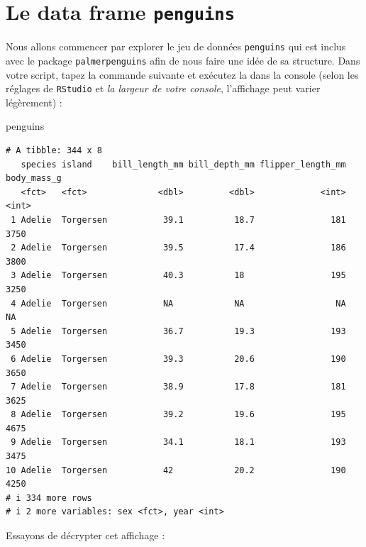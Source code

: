 \documentclass[
  a4paper,
  DIV=11,
  numbers=noendperiod,
  oneside]{scrreprt}
\newenvironment{Shaded}{}{}
\newcommand{\NormalTok}[1]{\textcolor[rgb]{0.14,0.16,0.18}{#1}}
\begin{document}
\section{\texorpdfstring{Le data frame
\texttt{penguins}}{Le data frame penguins}}\label{le-data-frame-penguins}

Nous allons commencer par explorer le jeu de données \texttt{penguins}
qui est inclus avec le package \texttt{palmerpenguins} afin de nous
faire une idée de sa structure. Dans votre script, tapez la commande
suivante et exécutez la dans la console (selon les réglages de
\texttt{RStudio} et \emph{la largeur de votre console}, l'affichage peut
varier légèrement) :

\begin{Shaded}
\begin{Highlighting}[]
\NormalTok{penguins}
\end{Highlighting}
\end{Shaded}

\begin{verbatim}
# A tibble: 344 x 8
   species island    bill_length_mm bill_depth_mm flipper_length_mm body_mass_g
   <fct>   <fct>              <dbl>         <dbl>             <int>       <int>
 1 Adelie  Torgersen           39.1          18.7               181        3750
 2 Adelie  Torgersen           39.5          17.4               186        3800
 3 Adelie  Torgersen           40.3          18                 195        3250
 4 Adelie  Torgersen           NA            NA                  NA          NA
 5 Adelie  Torgersen           36.7          19.3               193        3450
 6 Adelie  Torgersen           39.3          20.6               190        3650
 7 Adelie  Torgersen           38.9          17.8               181        3625
 8 Adelie  Torgersen           39.2          19.6               195        4675
 9 Adelie  Torgersen           34.1          18.1               193        3475
10 Adelie  Torgersen           42            20.2               190        4250
# i 334 more rows
# i 2 more variables: sex <fct>, year <int>
\end{verbatim}

Essayons de décrypter cet affichage :
\end{document}

